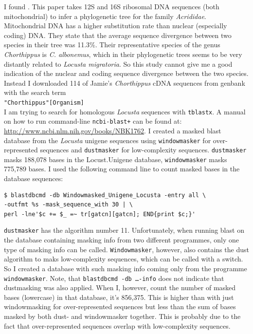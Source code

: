 \documentclass{article}\usepackage[]{graphicx}\usepackage[]{color}
\begin{document}
I found \cite{Liu2008a}. This paper takes 12S and 16S ribosomal DNA sequences (both mitochondrial) to infer a phylogenetic tree for the family \textit{Acrididae}. Mitochondrial DNA has a higher substitution rate than nuclear (especially coding) DNA. They state that the average sequence divergence between two species in their tree was 11.3\%. Their representative species of the genus \textit{Chorthippus} is \textit{C. albonemus}, which in their phylogenetic trees seems to be very distantly related to \textit{Locusta migratoria}. So this study cannot give me a good indication of the nuclear and coding sequence divergence between the two species. Instead I downloaded 114 of Jamie's \textit{Chorthippus} cDNA sequences from genbank with the search term\\
\verb!"Chorthippus"[Organism]! \\
I am trying to search for homologous \textit{Locusta} sequences with \texttt{tblastx}. A manual on how to run command-line \texttt{ncbi-blast+} can be found at: \url{http://www.ncbi.nlm.nih.gov/books/NBK1762}. I created a masked blast database from the \textit{Locusta} unigene sequences using \texttt{windowmasker} for over-represented sequences and \texttt{dustmasker} for low-complexity sequences. 
\texttt{dustmasker} masks 188,078 bases in the Locust.Unigene database, \texttt{windowmasker} masks 775,789 bases. I used the following command line to count masked bases in the database sequences:
\begin{Verbatim}
$ blastdbcmd -db Windowmasked_Unigene_Locusta -entry all \
-outfmt %s -mask_sequence_with 30 | \
perl -lne'$c += $_ =~ tr[gatcn][gatcn]; END{print $c;}'
\end{Verbatim}
\texttt{dustmasker} has the algorithm number 11. Unfortunately, when running blast on the database containing masking info from two different programmes, only one type of masking info can be called. \texttt{Windowmasker}, however, also contains the dust algorithm to maks low-complexity sequences, which can be called with a switch. So I created a database with such masking info coming only from the programme \texttt{windowmasker}. Note, that \texttt{blastdbcmd -db \ldots -info} does not indicate that dustmasking was also applied. When I, however, count the number of masked bases (lowercase) in that database, it's 856,375. This is higher than with just windowmasking for over-represented sequences but less than the sum of bases masked by both dust- and windowmasker together. This is probably due to the fact that over-represented sequences overlap with low-complexity sequences.
\end{document}
